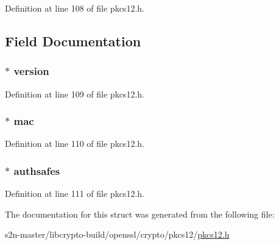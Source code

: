 Definition at line 108 of file pkcs12.\+h.



\subsection{Field Documentation}
\subsubsection[{\texorpdfstring{version}{version}}]{ $\ast$ version}\hypertarget{struct_p_k_c_s12_abf367aeef355b6acf5be7c569c4b28b0}{}\label{struct_p_k_c_s12_abf367aeef355b6acf5be7c569c4b28b0}


Definition at line 109 of file pkcs12.\+h.

\subsubsection[{\texorpdfstring{mac}{mac}}]{ $\ast$ mac}\hypertarget{struct_p_k_c_s12_a1f12dbea9e53e4cc1c85a566df83de0b}{}\label{struct_p_k_c_s12_a1f12dbea9e53e4cc1c85a566df83de0b}


Definition at line 110 of file pkcs12.\+h.

\subsubsection[{\texorpdfstring{authsafes}{authsafes}}]{ $\ast$ authsafes}\hypertarget{struct_p_k_c_s12_aaceb6025ce170d9984cef68788e96c8f}{}\label{struct_p_k_c_s12_aaceb6025ce170d9984cef68788e96c8f}


Definition at line 111 of file pkcs12.\+h.



The documentation for this struct was generated from the following file\+:\begin{DoxyCompactItemize}
\item 
s2n-\/master/libcrypto-\/build/openssl/crypto/pkcs12/\hyperlink{crypto_2pkcs12_2pkcs12_8h}{pkcs12.\+h}\end{DoxyCompactItemize}
